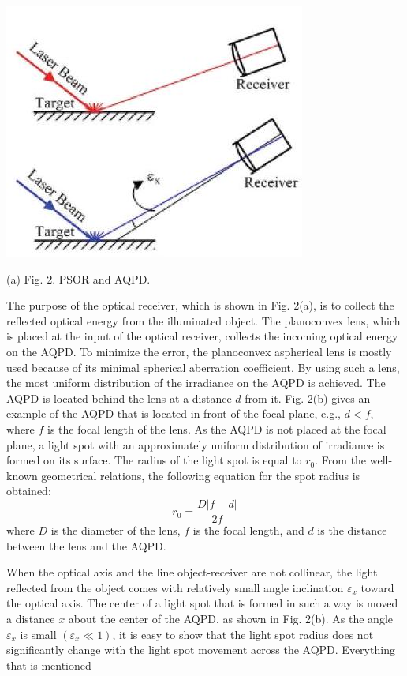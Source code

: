 \documentclass[10pt]{article}
\begin{document}
\includegraphics[max width=\textwidth]{5ecfdecb1168916efbeaf9054b715324-03}

(a) Fig. 2. PSOR and AQPD.

The purpose of the optical receiver, which is shown in Fig. 2(a), is to collect the reflected optical energy from the illuminated object. The planoconvex lens, which is placed at the input of the optical receiver, collects the incoming optical energy on the AQPD. To minimize the error, the planoconvex aspherical lens is mostly used because of its minimal spherical aberration coefficient. By using such a lens, the most uniform distribution of the irradiance on the AQPD is achieved. The AQPD is located behind the lens at a distance \(d\) from it. Fig. 2(b) gives an example of the AQPD that is located in front of the focal plane, e.g., \(d<f\), where \(f\) is the focal length of the lens. As the AQPD is not placed at the focal plane, a light spot with an approximately uniform distribution of irradiance is formed on its surface. The radius of the light spot is equal to \(r_{0}\). From the well-known geometrical relations, the following equation for the spot radius is obtained:
\[
r_{0}=\frac{D|f-d|}{2 f}
\]
where \(D\) is the diameter of the lens, \(f\) is the focal length, and \(d\) is the distance between the lens and the AQPD.

When the optical axis and the line object-receiver are not collinear, the light reflected from the object comes with relatively small angle inclination \(\varepsilon_{x}\) toward the optical axis. The center of a light spot that is formed in such a way is moved a distance \(x\) about the center of the AQPD, as shown in Fig. 2(b). As the angle \(\varepsilon_{x}\) is small \(\left(\varepsilon_{x} \ll 1\right)\), it is easy to show that the light spot radius does not significantly change with the light spot movement across the AQPD. Everything that is mentioned\\
\end{document}
